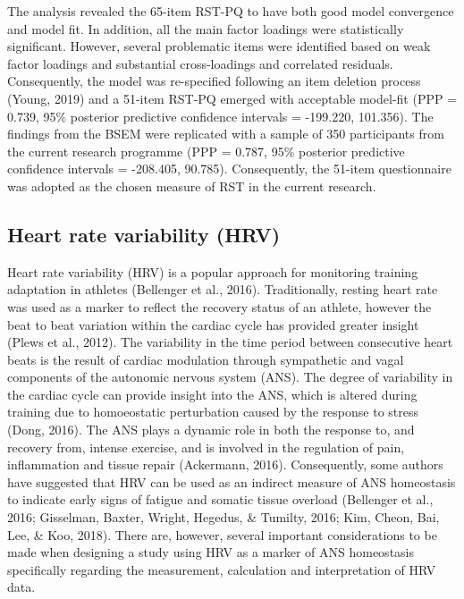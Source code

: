 \documentclass[
  english,
  man,floatsintext]{apa6}
\begin{document}
The analysis revealed the 65-item RST-PQ to have both good model convergence and model fit. In addition, all the main factor loadings were statistically significant.
However, several problematic items were identified based on weak factor loadings and substantial cross-loadings and correlated residuals.
Consequently, the model was re-specified following an item deletion process (Young, 2019) and a 51-item RST-PQ emerged with acceptable model-fit (PPP = 0.739, 95\% posterior predictive confidence intervals = -199.220, 101.356).
The findings from the BSEM were replicated with a sample of 350 participants from the current research programme (PPP = 0.787, 95\% posterior predictive confidence intervals = -208.405, 90.785).
Consequently, the 51-item questionnaire was adopted as the chosen measure of RST in the current research.

\hypertarget{heart-rate-variability-hrv}{%
\subsection{Heart rate variability (HRV)}\label{heart-rate-variability-hrv}}

Heart rate variability (HRV) is a popular approach for monitoring training adaptation in athletes (Bellenger et al., 2016).
Traditionally, resting heart rate was used as a marker to reflect the recovery status of an athlete, however the beat to beat variation within the cardiac cycle has provided greater insight (Plews et al., 2012).
The variability in the time period between consecutive heart beats is the result of cardiac modulation through sympathetic and vagal components of the autonomic nervous system (ANS).
The degree of variability in the cardiac cycle can provide insight into the ANS, which is altered during training due to homoeostatic perturbation caused by the response to stress (Dong, 2016).
The ANS plays a dynamic role in both the response to, and recovery from, intense exercise, and is involved in the regulation of pain, inflammation and tissue repair (Ackermann, 2016).
Consequently, some authors have suggested that HRV can be used as an indirect measure of ANS homeostasis to indicate early signs of fatigue and somatic tissue overload (Bellenger et al., 2016; Gisselman, Baxter, Wright, Hegedus, \& Tumilty, 2016; Kim, Cheon, Bai, Lee, \& Koo, 2018).
There are, however, several important considerations to be made when designing a study using HRV as a marker of ANS homeostasis specifically regarding the measurement, calculation and interpretation of HRV data.
\end{document}
